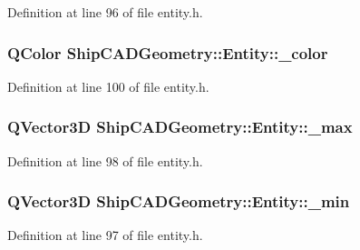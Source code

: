 Definition at line 96 of file entity.\-h.

\hypertarget{classShipCADGeometry_1_1Entity_a5107c39b85d2fe2cad3d8266a62168ac}{
\subsubsection[{\-\_\-color}]{\setlength{\rightskip}{0pt plus 5cm}Q\-Color Ship\-C\-A\-D\-Geometry\-::\-Entity\-::\-\_\-color\hspace{0.3cm}{\ttfamily [protected]}}}\label{classShipCADGeometry_1_1Entity_a5107c39b85d2fe2cad3d8266a62168ac}


Definition at line 100 of file entity.\-h.

\hypertarget{classShipCADGeometry_1_1Entity_a3dc59ce1edbde84e85f1b096466eb497}{
\subsubsection[{\-\_\-max}]{\setlength{\rightskip}{0pt plus 5cm}Q\-Vector3\-D Ship\-C\-A\-D\-Geometry\-::\-Entity\-::\-\_\-max\hspace{0.3cm}{\ttfamily [protected]}}}\label{classShipCADGeometry_1_1Entity_a3dc59ce1edbde84e85f1b096466eb497}


Definition at line 98 of file entity.\-h.

\hypertarget{classShipCADGeometry_1_1Entity_a873861fe2282f4300ef60c846bd7469e}{
\subsubsection[{\-\_\-min}]{\setlength{\rightskip}{0pt plus 5cm}Q\-Vector3\-D Ship\-C\-A\-D\-Geometry\-::\-Entity\-::\-\_\-min\hspace{0.3cm}{\ttfamily [protected]}}}\label{classShipCADGeometry_1_1Entity_a873861fe2282f4300ef60c846bd7469e}


Definition at line 97 of file entity.\-h.

